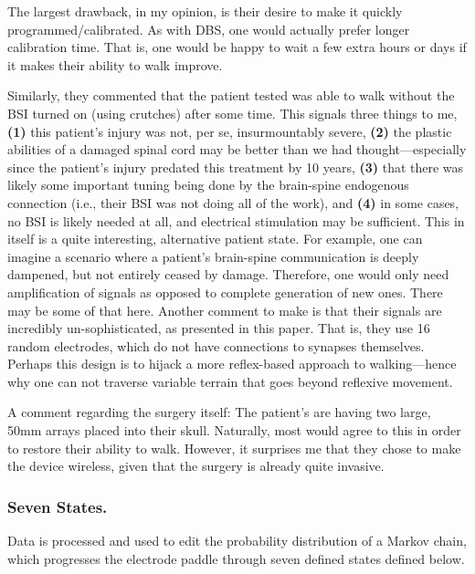 \documentclass[12pt]{report}
\begin{document}
The largest drawback, in my opinion, is their desire to make it quickly programmed/calibrated. As with DBS, one would actually prefer longer calibration time. That is, one would be happy to wait a few extra hours or days if it makes their ability to walk improve.\newline

Similarly, they commented that the patient tested was able to walk without the BSI turned on (using crutches) after some time. This signals three things to me, \textbf{(1)} this patient's injury was not, per se, insurmountably severe, \textbf{(2)} the plastic abilities of a damaged spinal cord may be better than we had thought---especially since the patient's injury predated this treatment by 10 years, \textbf{(3)} that there was likely some important tuning being done by the brain-spine endogenous connection (i.e., their BSI was not doing all of the work), and \textbf{(4)} in some cases, no BSI is likely needed at all, and electrical stimulation may be sufficient. This in itself is a quite interesting, alternative patient state. For example, one can imagine a scenario where a patient's brain-spine communication is deeply dampened, but not entirely ceased by damage. Therefore, one would only need amplification of signals as opposed to complete generation of new ones. There may be some of that here. Another comment to make is that their signals are incredibly un-sophisticated, as presented in this paper. That is, they use 16 random electrodes, which do not have connections to synapses themselves. Perhaps this design is to hijack a more reflex-based approach to walking---hence why one can not traverse variable terrain that goes beyond reflexive movement.\newline

A comment regarding the surgery itself: The patient's are having two large, 50mm arrays placed into their skull. Naturally, most would agree to this in order to restore their ability to walk. However, it surprises me that they chose to make the device wireless, given that the surgery is already quite invasive. 

\subsubsection{Seven States.} 

Data is processed and used to edit the probability distribution of a Markov chain, which progresses the electrode paddle through seven defined states defined below.
\end{document}
